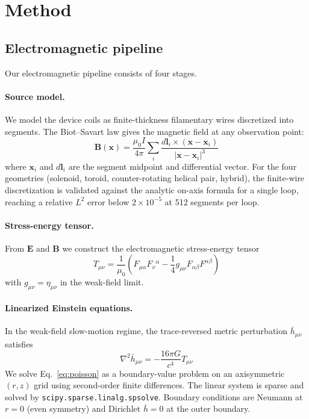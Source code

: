 \documentclass[11pt,a4paper,twocolumn]{article}
\begin{document}
\section{Method}
\label{sec:method}

\subsection{Electromagnetic pipeline}
\label{subsec:em}

Our electromagnetic pipeline consists of four stages.

\paragraph{Source model.} We model the device coils as finite-thickness
filamentary wires discretized into segments. The Biot--Savart law gives
the magnetic field at any observation point:
\begin{equation}
\mathbf{B}(\mathbf{x}) = \frac{\mu_0 I}{4\pi} \sum_i
\frac{d\mathbf{l}_i \times (\mathbf{x} - \mathbf{x}_i)}
{|\mathbf{x} - \mathbf{x}_i|^3}
\end{equation}
where $\mathbf{x}_i$ and $d\mathbf{l}_i$ are the segment midpoint and
differential vector. For the four geometries (solenoid, toroid,
counter-rotating helical pair, hybrid), the finite-wire discretization
is validated against the analytic on-axis formula for a single loop,
reaching a relative $L^2$ error below $2\times 10^{-5}$ at 512
segments per loop.

\paragraph{Stress-energy tensor.} From $\mathbf{E}$ and $\mathbf{B}$ we
construct the electromagnetic stress-energy tensor
\begin{equation}
T_{\mu\nu} = \frac{1}{\mu_0}\left(F_{\mu\alpha}F_\nu{}^\alpha
- \frac{1}{4} g_{\mu\nu} F_{\alpha\beta}F^{\alpha\beta}\right)
\end{equation}
with $g_{\mu\nu} = \eta_{\mu\nu}$ in the weak-field limit.

\paragraph{Linearized Einstein equations.} In the weak-field
slow-motion regime, the trace-reversed metric perturbation
$\bar{h}_{\mu\nu}$ satisfies
\begin{equation}
\nabla^2 \bar{h}_{\mu\nu} = -\frac{16\pi G}{c^4} T_{\mu\nu}
\label{eq:poisson}
\end{equation}
We solve Eq.~\eqref{eq:poisson} as a boundary-value problem on an
axisymmetric $(r,z)$ grid using second-order finite differences.
The linear system is sparse and solved by
\texttt{scipy.sparse.linalg.spsolve}. Boundary conditions are Neumann
at $r=0$ (even symmetry) and Dirichlet $\bar{h}=0$ at the outer boundary.
\end{document}
